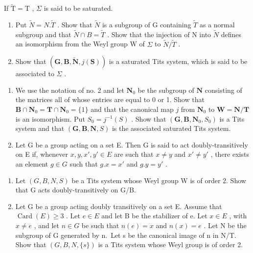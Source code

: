 If \(\tilde{\mathrm{T}} = \mathrm{T}\) , \(\Sigma\) is said to be saturated.

\begin{enumerate}
\def\labelenumi{\alph{enumi})}
\setcounter{enumi}{1}
\item
  Put \(\tilde{N} = N.\tilde{T}\) . Show that \(\tilde{N}\) is a subgroup of G containing \(\tilde{T}\) as a normal subgroup and that \(\tilde{N} \cap B = \tilde{T}\) . Show that the injection of N into \(\tilde{N}\) defines an isomorphism from the Weyl group W of \(\Sigma\) to \(\tilde{N}/\tilde{T}\) .
\item
  Show that \((\mathbf{G},\mathbf{B},\tilde{\mathbf{N}},j(\mathbf{S}))\) is a saturated Tits system, which is said to be associated to \(\Sigma\) .
\end{enumerate}

\begin{enumerate}
\def\labelenumi{\arabic{enumi})}
\setcounter{enumi}{5}
\item
  We use the notation of no. 2 and let \(\mathbf{N}_0\) be the subgroup of \(\mathbf{N}\) consisting of the matrices all of whose entries are equal to 0 or 1. Show that \(\mathbf{B} \cap \mathbf{N}_0 = \mathbf{T} \cap \mathbf{N}_0 = \{1\}\) and that the canonical map \(j\) from \(\mathbf{N}_0\) to \(\mathbf{W} = \mathbf{N} / \mathbf{T}\) is an isomorphism. Put \(S_0 = j^{-1}(S)\) . Show that \((\mathbf{G}, \mathbf{B}, \mathbf{N}_0, S_0)\) is a Tits system and that \((\mathbf{G}, \mathbf{B}, \mathbf{N}, S)\) is the associated saturated Tits system.
\item
  Let G be a group acting on a set E. Then G is said to act doubly-transitively on E if, whenever \(x, y, x', y' \in E\) are such that \(x \neq y\) and \(x' \neq y'\) , there exists an element \(g \in G\) such that \(g.x = x'\) and \(g.y = y'\) .
\end{enumerate}

\begin{enumerate}
\def\labelenumi{\alph{enumi})}
\item
  Let \((G, B, N, S)\) be a Tits system whose Weyl group W is of order 2. Show that G acts doubly-transitively on G/B.
\item
  Let G be a group acting doubly transitively on a set E. Assume that \(\operatorname{Card}(E) \geqslant 3\) . Let \(e \in E\) and let B be the stabilizer of e. Let \(x \in E\) , with \(x \neq e\) , and let \(n \in G\) be such that \(n(e) = x\) and \(n(x) = e\) . Let N be the subgroup of G generated by n.~Let s be the canonical image of n in N/T. Show that \((G, B, N, \{s\})\) is a Tits system whose Weyl group is of order 2.
\end{enumerate}


